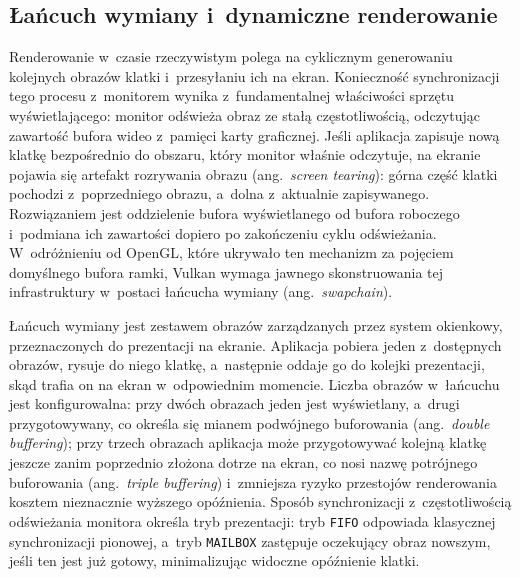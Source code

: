 \subsection{Łańcuch wymiany i~dynamiczne renderowanie}
\label{sec:vulkan_swapchain}

Renderowanie w~czasie rzeczywistym polega na cyklicznym generowaniu kolejnych obrazów klatki
i~przesyłaniu ich na ekran. Konieczność synchronizacji tego procesu z~monitorem wynika
z~fundamentalnej właściwości sprzętu wyświetlającego: monitor odświeża obraz ze stałą
częstotliwością, odczytując zawartość bufora wideo z~pamięci karty graficznej.
Jeśli aplikacja zapisuje nową klatkę bezpośrednio do obszaru, który monitor właśnie odczytuje,
na ekranie pojawia się artefakt rozrywania obrazu (ang.~\textit{screen tearing}):
górna część klatki pochodzi z~poprzedniego obrazu, a~dolna z~aktualnie zapisywanego.
Rozwiązaniem jest oddzielenie bufora wyświetlanego od bufora roboczego i~podmiana ich zawartości
dopiero po zakończeniu cyklu odświeżania. W~odróżnieniu od OpenGL, które ukrywało ten
mechanizm za pojęciem domyślnego bufora ramki, Vulkan wymaga jawnego skonstruowania tej
infrastruktury w~postaci łańcucha wymiany (ang.~\textit{swapchain}).

Łańcuch wymiany jest zestawem obrazów zarządzanych przez system okienkowy, przeznaczonych
do prezentacji na ekranie. Aplikacja pobiera jeden z~dostępnych obrazów, rysuje do niego
klatkę, a~następnie oddaje go do kolejki prezentacji, skąd trafia on na ekran w~odpowiednim
momencie. Liczba obrazów w~łańcuchu jest konfigurowalna: przy dwóch obrazach jeden jest
wyświetlany, a~drugi przygotowywany, co określa się mianem podwójnego buforowania
(ang.~\textit{double buffering}); przy trzech obrazach aplikacja może przygotowywać kolejną klatkę
jeszcze zanim poprzednio złożona dotrze na ekran, co nosi nazwę potrójnego buforowania
(ang.~\textit{triple buffering}) i~zmniejsza ryzyko przestojów renderowania kosztem nieznacznie
wyższego opóźnienia. Sposób synchronizacji z~częstotliwością odświeżania monitora określa
tryb prezentacji: tryb \texttt{FIFO} odpowiada klasycznej synchronizacji pionowej, a~tryb
\texttt{MAILBOX} zastępuje oczekujący obraz nowszym, jeśli ten jest już gotowy, minimalizując
widoczne opóźnienie klatki.

